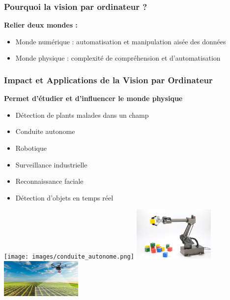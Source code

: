 \documentclass{beamer}
\begin{document}
\begin{frame}
    \frametitle{Pourquoi la vision par ordinateur ?}
    \textbf{Relier deux mondes :}
    \begin{itemize}
        \item Monde numérique : automatisation et manipulation aisée des données
        \item Monde physique : complexité de compréhension et d'automatisation
    \end{itemize}
\end{frame}

\begin{frame}
    \frametitle{Impact et Applications de la Vision par Ordinateur}
    \textbf{Permet d'étudier et d'influencer le monde physique}
    \begin{itemize}
        \item Détection de plants malades dans un champ
        \item Conduite autonome
        \item Robotique
        \item Surveillance industrielle 
        \item Reconnaissance faciale
        \item Détection d'objets en temps réel
    \end{itemize}
    \begin{center}
        \texttt{[image: images/conduite\_autonome.png]}
        \includegraphics[width=0.3\textwidth]{images/robotique.png}
        \includegraphics[width=0.3\textwidth]{images/detection_champ.png}
    \end{center}
\end{frame}
\end{document}

